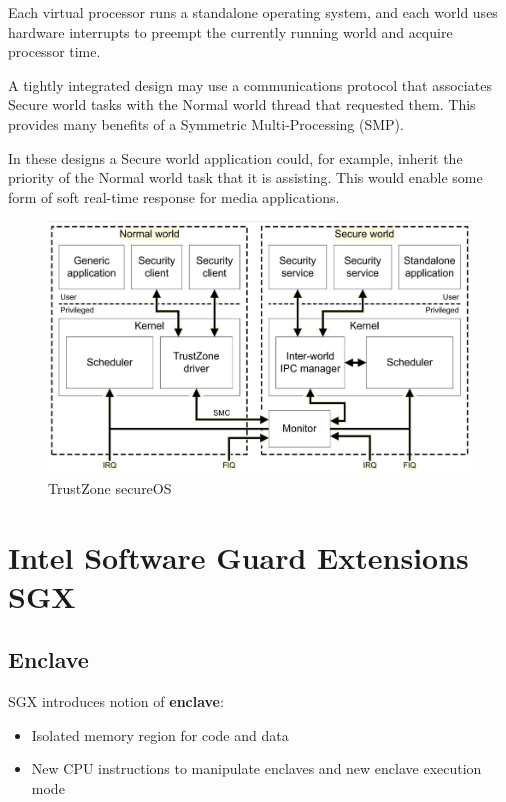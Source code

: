 Each virtual processor runs a standalone operating system, and each world uses
hardware interrupts to preempt the currently running world and acquire
processor time.

A tightly integrated design may use a communications protocol that associates Secure world tasks with the Normal world thread that requested them. 
This provides many benefits of a Symmetric Multi-Processing (SMP).

In these designs a Secure world application could, for example, inherit the priority of the Normal world task that it is assisting. This would enable some form of soft real-time response for media applications.

\begin{figure}[htbp]
   \centering
   \includegraphics{images/TrustZone_secureOS.png}
   \caption{TrustZone secureOS}
   \label{fig:TrustZone_secureOS}
\end{figure}

\section{Intel Software Guard Extensions SGX}
\subsection{Enclave}



SGX introduces notion of \textbf{enclave}:
\begin{itemize}
   \item Isolated memory region for code and data
   \item New CPU instructions to manipulate enclaves
   and new enclave execution mode
\end{itemize}

